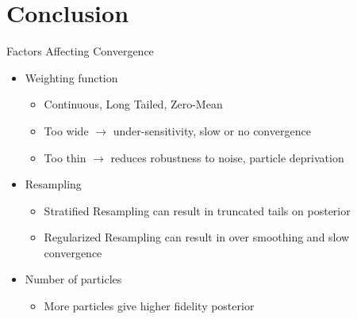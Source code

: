\documentclass{beamer}
\begin{document}
\section{Conclusion}
\begin{frame}{Factors Affecting Convergence}
    \begin{itemize}
        \item Weighting function
            \begin{itemize}
                \item Continuous, Long Tailed, Zero-Mean 
                \item Too wide $\rightarrow$ under-sensitivity, 
                    slow or no convergence
                \item Too thin $\rightarrow$ reduces robustness 
                    to noise, particle deprivation
            \end{itemize}
        \item Resampling 
            \begin{itemize}
                \item Stratified Resampling can result in truncated tails 
                        on posterior
                \item Regularized Resampling can result in over smoothing and 
                        slow convergence
            \end{itemize}
        \item Number of particles
            \begin{itemize}
                \item More particles give higher fidelity posterior
            \end{itemize}
    \end{itemize}
\end{frame}
\end{document}
